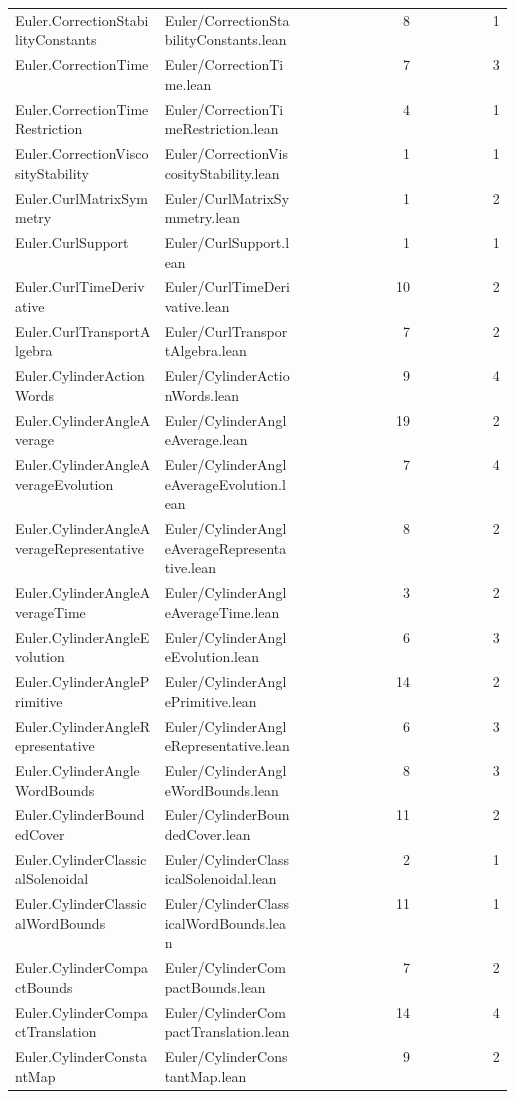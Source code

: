 \begin{longtable}{p{0.30\linewidth}p{0.28\linewidth}rr}
Euler.CorrectionStabilityConstants & Euler/CorrectionStabilityConstants.lean & 8 & 1\\
Euler.CorrectionTime & Euler/CorrectionTime.lean & 7 & 3\\
Euler.CorrectionTimeRestriction & Euler/CorrectionTimeRestriction.lean & 4 & 1\\
Euler.CorrectionViscosityStability & Euler/CorrectionViscosityStability.lean & 1 & 1\\
Euler.CurlMatrixSymmetry & Euler/CurlMatrixSymmetry.lean & 1 & 2\\
Euler.CurlSupport & Euler/CurlSupport.lean & 1 & 1\\
Euler.CurlTimeDerivative & Euler/CurlTimeDerivative.lean & 10 & 2\\
Euler.CurlTransportAlgebra & Euler/CurlTransportAlgebra.lean & 7 & 2\\
Euler.CylinderActionWords & Euler/CylinderActionWords.lean & 9 & 4\\
Euler.CylinderAngleAverage & Euler/CylinderAngleAverage.lean & 19 & 2\\
Euler.CylinderAngleAverageEvolution & Euler/CylinderAngleAverageEvolution.lean & 7 & 4\\
Euler.CylinderAngleAverageRepresentative & Euler/CylinderAngleAverageRepresentative.lean & 8 & 2\\
Euler.CylinderAngleAverageTime & Euler/CylinderAngleAverageTime.lean & 3 & 2\\
Euler.CylinderAngleEvolution & Euler/CylinderAngleEvolution.lean & 6 & 3\\
Euler.CylinderAnglePrimitive & Euler/CylinderAnglePrimitive.lean & 14 & 2\\
Euler.CylinderAngleRepresentative & Euler/CylinderAngleRepresentative.lean & 6 & 3\\
Euler.CylinderAngleWordBounds & Euler/CylinderAngleWordBounds.lean & 8 & 3\\
Euler.CylinderBoundedCover & Euler/CylinderBoundedCover.lean & 11 & 2\\
Euler.CylinderClassicalSolenoidal & Euler/CylinderClassicalSolenoidal.lean & 2 & 1\\
Euler.CylinderClassicalWordBounds & Euler/CylinderClassicalWordBounds.lean & 11 & 1\\
Euler.CylinderCompactBounds & Euler/CylinderCompactBounds.lean & 7 & 2\\
Euler.CylinderCompactTranslation & Euler/CylinderCompactTranslation.lean & 14 & 4\\
Euler.CylinderConstantMap & Euler/CylinderConstantMap.lean & 9 & 2\\

\end{longtable}
